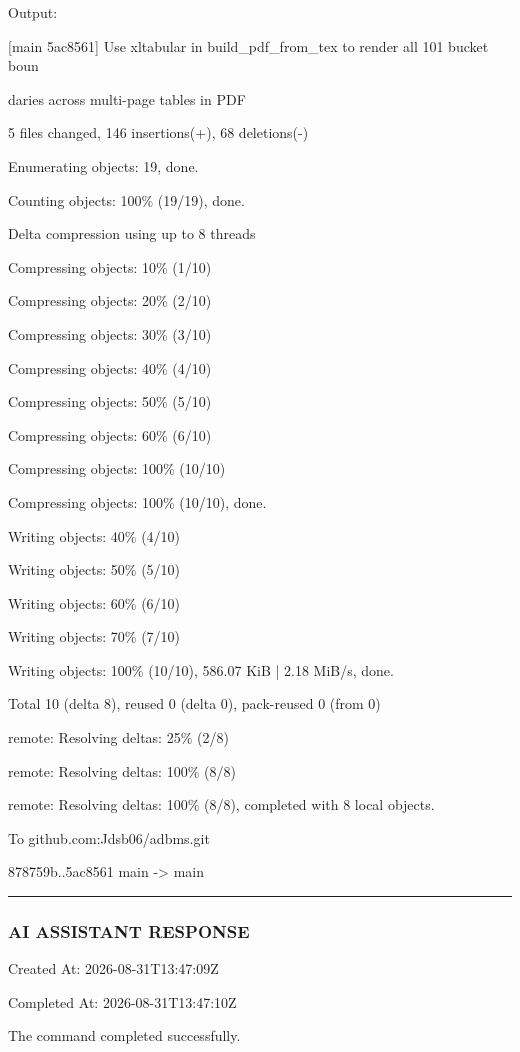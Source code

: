 \documentclass[11pt,a4paper]{article}
\begin{document}
{{{Output:

[main 5ac8561] Use xltabular in build\_pdf\_from\_tex to render all 101 bucket boun

daries across multi-page tables in PDF

5 files changed, 146 insertions(+), 68 deletions(-)

Enumerating objects: 19, done.

Counting objects: 100\% (19/19), done.

Delta compression using up to 8 threads

Compressing objects:  10\% (1/10)

Compressing objects:  20\% (2/10)

Compressing objects:  30\% (3/10)

Compressing objects:  40\% (4/10)

Compressing objects:  50\% (5/10)

Compressing objects:  60\% (6/10)

Compressing objects: 100\% (10/10)

Compressing objects: 100\% (10/10), done.

Writing objects:  40\% (4/10)

Writing objects:  50\% (5/10)

Writing objects:  60\% (6/10)

Writing objects:  70\% (7/10)

Writing objects: 100\% (10/10), 586.07 KiB | 2.18 MiB/s, done.

Total 10 (delta 8), reused 0 (delta 0), pack-reused 0 (from 0)

remote: Resolving deltas:  25\% (2/8)

remote: Resolving deltas: 100\% (8/8)

remote: Resolving deltas: 100\% (8/8), completed with 8 local objects.

To github.com:Jdsb06/adbms.git

878759b..5ac8561  main -> main


\hrule

\subsubsection{AI ASSISTANT RESPONSE}

Created At: 2026-08-31T13:47:09Z

Completed At: 2026-08-31T13:47:10Z


The command completed successfully.

}}}
\end{document}
